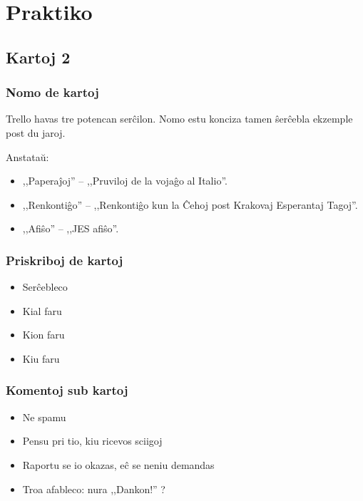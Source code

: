 \section{Praktiko}
\subsection{Kartoj 2}

  \begin{frame}
    \frametitle{Nomo de kartoj}
		
	Trello havas tre potencan serĉilon. Nomo estu konciza tamen ŝerĉebla ekzemple post du jaroj.
	
	Anstataŭ:
	\begin{itemize}
		\item ,,Paperaĵoj'' -- ,,Pruviloj de la vojaĝo al Italio''.
		\item ,,Renkontiĝo'' -- ,,Renkontiĝo kun la Ĉehoj post Krakovaj Esperantaj Tagoj''.
		\item ,,Afiŝo'' -- ,,JES afiŝo''.
	\end{itemize}
  \end{frame}


  \begin{frame}
    \frametitle{Priskriboj de kartoj}
			
  	
	\begin{itemize}
		\item Serĉebleco
		\item Kial faru
		\item Kion faru
		\item Kiu faru
	\end{itemize}
	
  \end{frame}

  \begin{frame}
    \frametitle{Komentoj sub kartoj}
	
  		
	\begin{itemize}
		\item Ne spamu
		\item Pensu pri tio, kiu ricevos sciigoj
		\item Raportu se io okazas, eĉ se neniu demandas
		\item Troa afableco: nura ,,Dankon!'' ?
	\end{itemize}
	
  \end{frame}


